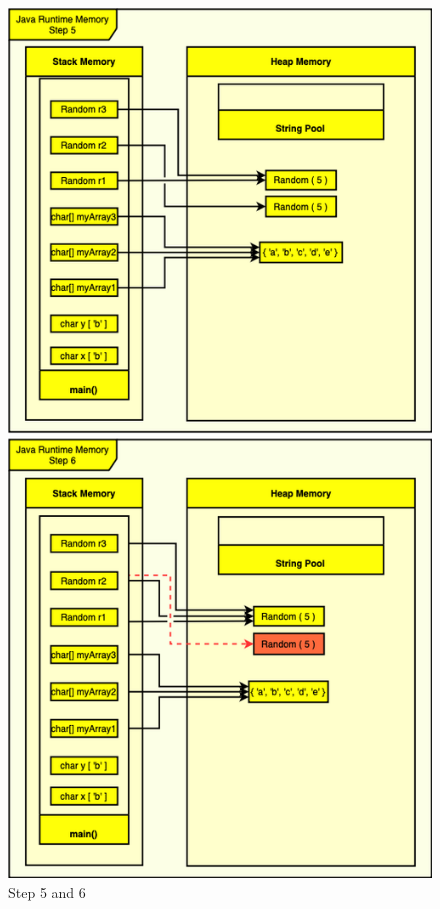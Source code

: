 \documentclass{assignment}
\begin{document}
\begin{figure}[p]
    \centering
    \includegraphics[scale=0.55]{assets/homework2Diagram(5-6).png}
    \caption{Step 5 and 6}
\end{figure}
\end{document}
